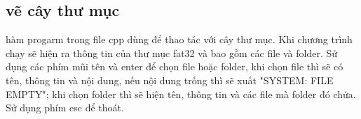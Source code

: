 \subsection{vẽ cây thư mục}
hàm progarm trong file cpp dùng để thao tác với cây thư mục. Khi chương trình chạy sẽ hiện ra thông tin của thư mục fat32 và bao gồm các file và folder. Sử dụng các phím mũi tên và enter để chọn file hoặc folder, khi chọn file thì sẽ có tên, thông tin và nội dung, nếu nội dung trống thì sẽ xuất "SYSTEM: FILE EMPTY"; khi chọn folder thì sẽ hiện tên, thông tin và các file mà folder đó chứa. Sử dụng phím esc để thoát.